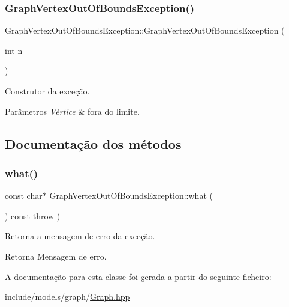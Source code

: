 \subsubsection{\texorpdfstring{Graph\+Vertex\+Out\+Of\+Bounds\+Exception()}{GraphVertexOutOfBoundsException()}}
{\footnotesize\ttfamily Graph\+Vertex\+Out\+Of\+Bounds\+Exception\+::\+Graph\+Vertex\+Out\+Of\+Bounds\+Exception (\begin{DoxyParamCaption}\item[{int}]{n }\end{DoxyParamCaption})\hspace{0.3cm}{\ttfamily [inline]}}

Construtor da exceção. 
\begin{DoxyParams}{Parâmetros}
{\em Vértice} & fora do limite. \\
\hline
\end{DoxyParams}


\subsection{Documentação dos métodos}
\mbox{\label{classGraphVertexOutOfBoundsException_ac85fc95ea1c178023571adf7a9b8b0df}} 
\subsubsection{\texorpdfstring{what()}{what()}}
{\footnotesize\ttfamily const char$\ast$ Graph\+Vertex\+Out\+Of\+Bounds\+Exception\+::what (\begin{DoxyParamCaption}{ }\end{DoxyParamCaption}) const throw  ) \hspace{0.3cm}{\ttfamily [inline]}}

Retorna a mensagem de erro da exceção. \begin{DoxyReturn}{Retorna}
Mensagem de erro. 
\end{DoxyReturn}


A documentação para esta classe foi gerada a partir do seguinte ficheiro\+:\begin{DoxyCompactItemize}
\item 
include/models/graph/\hyperlink{Graph_8hpp}{Graph.\+hpp}\end{DoxyCompactItemize}
